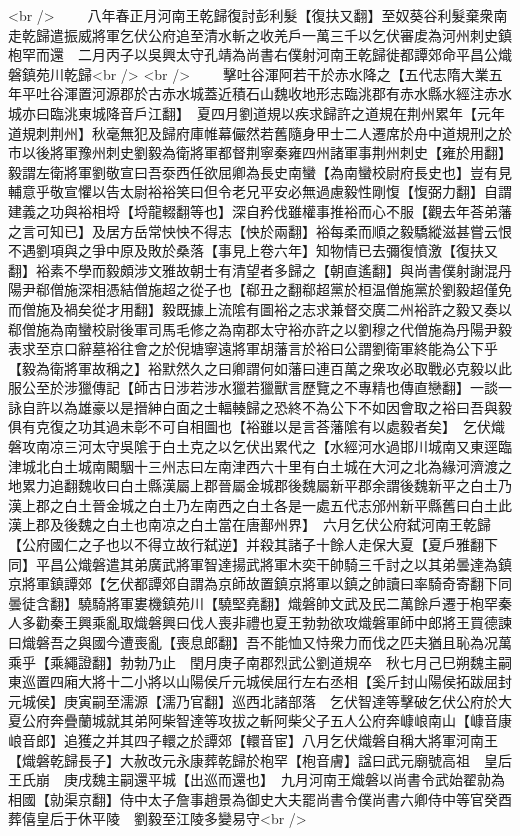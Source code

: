 <br />
　　八年春正月河南王乾歸復討彭利髮【復扶又翻】至奴葵谷利髮棄衆南走乾歸遣振威將軍乞伏公府追至清水斬之收羌戶一萬三千以乞伏審䖍為河州刺史鎮枹罕而還　二月丙子以吳興太守孔靖為尚書右僕射河南王乾歸徙都譚郊命平昌公熾磐鎮苑川乾歸<br />
<br />
　　擊吐谷渾阿若干於赤水降之【五代志隋大業五年平吐谷渾置河源郡於古赤水城蓋近積石山魏收地形志臨洮郡有赤水縣水經注赤水城亦曰臨洮東城降音戶江翻】　夏四月劉道規以疾求歸許之道規在荆州累年【元年道規刺荆州】秋毫無犯及歸府庫帷幕儼然若舊隨身甲士二人遷席於舟中道規刑之於市以後將軍豫州刺史劉毅為衛將軍都督荆寧秦雍四州諸軍事荆州刺史【雍於用翻】毅謂左衛將軍劉敬宣曰吾沗西任欲屈卿為長史南蠻【為南蠻校尉府長史也】豈有見輔意乎敬宣懼以告太尉裕裕笑曰但令老兄平安必無過慮毅性剛愎【愎弼力翻】自謂建義之功與裕相埒【埒龍輟翻等也】深自矜伐雖權事推裕而心不服【觀去年荅弟藩之言可知已】及居方岳常怏怏不得志【怏於兩翻】裕每柔而順之毅驕縱滋甚嘗云恨不遇劉項與之爭中原及敗於桑落【事見上卷六年】知物情已去彌復憤激【復扶又翻】裕素不學而毅頗涉文雅故朝士有清望者多歸之【朝直遙翻】與尚書僕射謝混丹陽尹郗僧施深相憑結僧施超之從子也【郗丑之翻郗超黨於桓温僧施黨於劉毅超僅免而僧施及禍矣從才用翻】毅既據上流隂有圖裕之志求兼督交廣二州裕許之毅又奏以郗僧施為南蠻校尉後軍司馬毛修之為南郡太守裕亦許之以劉穆之代僧施為丹陽尹毅表求至京口辭墓裕往會之於倪塘寧遠將軍胡藩言於裕曰公謂劉衛軍終能為公下乎【毅為衛將軍故稱之】裕默然久之曰卿謂何如藩曰連百萬之衆攻必取戰必克毅以此服公至於涉獵傳記【師古日涉若涉水獵若獵獸言歷覽之不專精也傳直戀翻】一談一詠自許以為雄豪以是搢紳白面之士輻輳歸之恐終不為公下不如因會取之裕曰吾與毅俱有克復之功其過未彰不可自相圖也【裕雖以是言荅藩隂有以處毅者矣】　乞伏熾磐攻南凉三河太守吳隂于白土克之以乞伏出累代之【水經河水過邯川城南又東逕臨津城北白土城南闞駰十三州志曰左南津西六十里有白土城在大河之北為緣河濟渡之地累力追翻魏收曰白土縣漢屬上郡晉屬金城郡後魏屬新平郡余謂後魏新平之白土乃漢上郡之白土晉金城之白土乃左南西之白土各是一處五代志邠州新平縣舊曰白土此漢上郡及後魏之白土也南凉之白土當在唐鄯州界】　六月乞伏公府弑河南王乾歸【公府國仁之子也以不得立故行弑逆】并殺其諸子十餘人走保大夏【夏戶雅翻下同】平昌公熾磐遣其弟廣武將軍智達揚武將軍木奕干帥騎三千討之以其弟曇達為鎮京將軍鎮譚郊【乞伏都譚郊自謂為京師故置鎮京將軍以鎮之帥讀曰率騎奇寄翻下同曇徒含翻】驍騎將軍婁機鎮苑川【驍堅堯翻】熾磐帥文武及民二萬餘戶遷于枹罕秦人多勸秦王興乘亂取熾磐興曰伐人喪非禮也夏王勃勃欲攻熾磐軍師中郎將王買德諫曰熾磐吾之與國今遭喪亂【喪息郎翻】吾不能恤又恃衆力而伐之匹夫猶且恥為况萬乘乎【乘繩證翻】勃勃乃止　閏月庚子南郡烈武公劉道規卒　秋七月己巳朔魏主嗣東巡置四廂大將十二小將以山陽侯斤元城侯屈行左右丞相【奚斤封山陽侯拓跋屈封元城侯】庚寅嗣至濡源【濡乃官翻】巡西北諸部落　乞伏智達等擊破乞伏公府於大夏公府奔疊蘭城就其弟阿柴智達等攻拔之斬阿柴父子五人公府奔嵻㟍南山【嵻音康㟍音郎】追獲之并其四子轘之於譚郊【轘音宦】八月乞伏熾磐自稱大將軍河南王【熾磐乾歸長子】大赦改元永康葬乾歸於枹罕【枹音膚】諡曰武元廟號高祖　皇后王氏崩　庚戌魏主嗣還平城【出巡而還也】　九月河南王熾磐以尚書令武始翟勍為相國【勍渠京翻】侍中太子詹事趙景為御史大夫罷尚書令僕尚書六卿侍中等官癸酉葬僖皇后于休平陵　劉毅至江陵多變易守<br />
